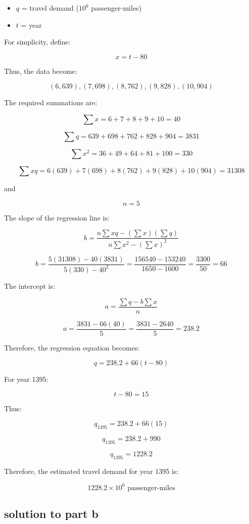 \documentclass{KPS_assignment}
\begin{document}
\begin{itemize}
    \item $q$ = travel demand ($10^6$ passenger-miles)
    \item $t$ = year
\end{itemize}

For simplicity, define:

\[
x=t-80
\]

Thus, the data become:

\[
(6,639), (7,698), (8,762), (9,828), (10,904)
\]

The required summations are:

\[
\sum x = 6+7+8+9+10 = 40
\]

\[
\sum q = 639+698+762+828+904 = 3831
\]

\[
\sum x^2 = 36+49+64+81+100 = 330
\]

\[
\sum xq =
6(639)+7(698)+8(762)+9(828)+10(904)
=31308
\]

and

\[
n=5
\]

The slope of the regression line is:

\[
b=
\frac{
n\sum xq-(\sum x)(\sum q)
}{
n\sum x^2-(\sum x)^2
}
\]

\[
b=
\frac{
5(31308)-40(3831)
}{
5(330)-40^2
}
=
\frac{
156540-153240
}{
1650-1600
}
=
\frac{3300}{50}
=66
\]

The intercept is:

\[
a=
\frac{
\sum q-b\sum x
}{n}
\]

\[
a=
\frac{
3831-66(40)
}{5}
=
\frac{
3831-2640
}{5}
=
238.2
\]

Therefore, the regression equation becomes:

\[
\boxed{
q = 238.2 + 66(t-80)
}
\]

For year 1395:

\[
t-80 = 15
\]

Thus:

\[
q_{1395}=238.2+66(15)
\]

\[
q_{1395}=238.2+990
\]

\[
\boxed{
q_{1395}=1228.2
}
\]

Therefore, the estimated travel demand for year 1395 is:

\[
\boxed{
1228.2\times 10^6
\text{ passenger-miles}
}
\]



\subsection{solution to part b}
\end{document}
